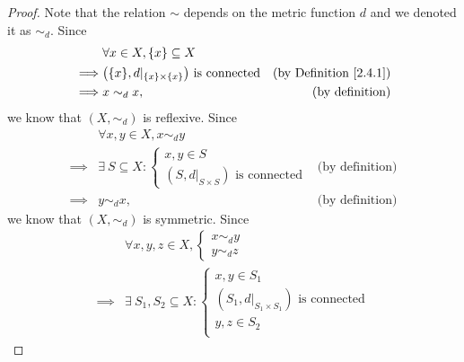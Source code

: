 \begin{proof}
    Note that the relation \(\sim\) depends on the metric function \(d\) and we denoted it as \(\sim_d\).
    Since
    \begin{align*}
                 & \forall x \in X, \{x\} \subseteq X                                                                 \\
        \implies & \big(\{x\}, d|_{\{x\} \times \{x\}}\big) \text{ is connected} & \text{(by Definition \ref{2.4.1})} \\
        \implies & x \sim_d x,                                                   & \text{(by definition)}
    \end{align*}
    we know that \((X, \sim_d)\) is reflexive.
    Since
    \begin{align*}
                 & \forall x, y \in X, x \sim_d y                                     \\
        \implies & \exists\ S \subseteq X : \begin{cases}
                                                x, y \in S \\
                                                (S, d|_{S \times S}) \text{ is connected}
                                            \end{cases} & \text{(by definition)}  \\
        \implies & y \sim_d x,                               & \text{(by definition)}
    \end{align*}
    we know that \((X, \sim_d)\) is symmetric.
    Since
    \begin{align*}
                 & \forall x, y, z \in X, \begin{cases}
                                              x \sim_d y \\
                                              y \sim_d z
                                          \end{cases}                                                                                            \\
        \implies & \exists\ S_1, S_2 \subseteq X : \begin{cases}
                                                       x, y \in S_1                                    \\
                                                       (S_1, d|_{S_1 \times S_1}) \text{ is connected} \\
                                                       y, z \in S_2                                    \\

\end{cases}
\end{align*}
\end{proof}
